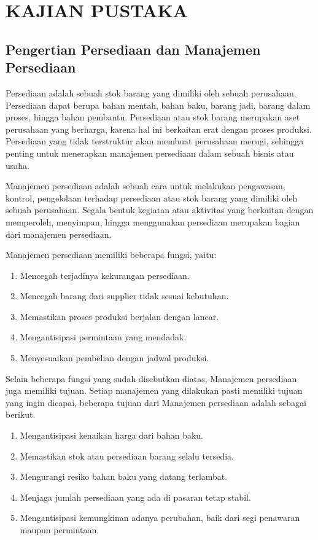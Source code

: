 
\chapter{KAJIAN PUSTAKA} 

\section{Pengertian Persediaan dan Manajemen Persediaan}

Persediaan adalah sebuah stok barang yang dimiliki oleh sebuah perusahaan. Persediaan dapat berupa bahan mentah, bahan baku, barang jadi, barang dalam proses, hingga bahan pembantu. Persediaan atau stok barang merupakan aset perusahaan yang berharga, karena hal ini berkaitan erat dengan proses produksi. Persediaan yang tidak terstruktur akan membuat perusahaan merugi, sehingga penting untuk menerapkan manajemen persediaan dalam sebuah bisnis atau usaha.

Manajemen persediaan adalah sebuah cara untuk melakukan pengawasan, kontrol, pengelolaan terhadap persediaan atau stok barang yang dimiliki oleh sebuah perusahaan. Segala bentuk kegiatan atau aktivitas yang berkaitan dengan memperoleh, menyimpan, hingga menggunakan persediaan merupakan bagian dari manajemen persediaan.

Manajemen persediaan memiliki beberapa fungsi, yaitu:
\begin{enumerate}
	\item Mencegah terjadinya kekurangan persediaan.
	\item Mencegah barang dari supplier tidak sesuai kebutuhan.
	\item Memastikan proses produksi berjalan dengan lancar.
	\item Mengantisipasi permintaan yang mendadak.
	\item Menyesuaikan pembelian dengan jadwal produksi.
\end{enumerate}

Selain beberapa fungsi yang sudah disebutkan diatas, Manajemen persediaan juga memiliki tujuan. Setiap manajemen yang dilakukan pasti memiliki tujuan yang ingin dicapai, beberapa tujuan dari Manajemen persediaan adalah sebagai berikut.
\begin{enumerate}
	\item Mengantisipasi kenaikan harga dari bahan baku.
	\item Memastikan stok atau persediaan barang selalu tersedia.
	\item Mengurangi resiko bahan baku yang datang terlambat.
	\item Menjaga jumlah persediaan yang ada di pasaran tetap stabil.
	\item Mengantisipasi kemungkinan adanya perubahan, baik dari segi penawaran maupun permintaan.
\end{enumerate}

